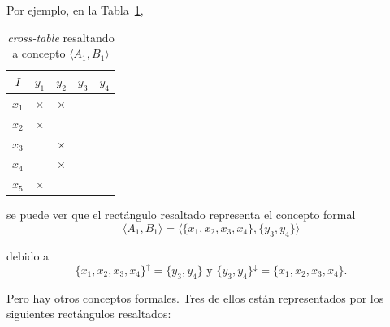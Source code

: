 \documentclass[12pt,oneside,letterpaper]{book}
\newcommand{\eng}[1]{\textit{#1}\xspace}			%
\newcommand{\mycell}[1]{\cellcolor{gray!25}\color{blue}{#1}}
\theoremstyle{definition}
\begin{document}
 Por ejemplo, en la Tabla~\ref{tbl:cross_table_highlighted}, 
\begin{table}[h!]
	\centering
	\begin{tabular}{|c|cccc|}
		\hline
		$I$		& $y_1$		& $y_2$ 	& $y_3$ 				& $y_4$ 				\\ \hline
		$x_1$	& $\times$	& $\times$	& \mycell{$\times$} 	& \mycell{$\times$} 	\\
		$x_2$	& $\times$	& 			& \mycell{$\times$} 	& \mycell{$\times$} 	\\
		$x_3$	& 			& $\times$	& \mycell{$\times$} 	& \mycell{$\times$} 	\\
		$x_4$	& 			& $\times$	& \mycell{$\times$} 	& \mycell{$\times$} 	\\
		$x_5$	& $\times$	& 			& 		 				& 		 				\\
		\hline
	\end{tabular}
	\caption{\eng{cross-table} resaltando a concepto $\langle A_1, B_1 \rangle$}
	\label{tbl:cross_table_highlighted}
\end{table}

se puede ver que el rectángulo resaltado representa el concepto formal
 \begin{equation*}
 	\langle A_1,B_1 \rangle = \langle\{x_1,x_2,x_3,x_4\}, \{y_3,y_4\}\rangle
 \end{equation*}

 debido a 
 \begin{equation*}
 	\{x_1,x_2,x_3,x_4\}^\uparrow = \{y_3,y_4\}\text{ y }\{y_3,y_4\}^\downarrow = \{x_1,x_2,x_3,x_4\}.
 \end{equation*}

Pero hay otros conceptos formales. Tres de ellos están representados por los siguientes rectángulos resaltados:
\end{document}
